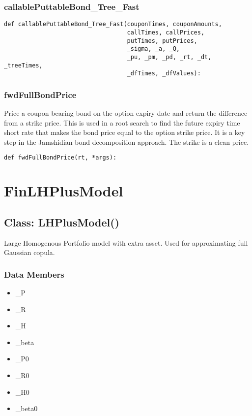 \documentclass[twoside,11pt]{book}
\begin{document}
\subsubsection*{{\bf callablePuttableBond\_Tree\_Fast}}


\begin{lstlisting}
def callablePuttableBond_Tree_Fast(couponTimes, couponAmounts, 
                                   callTimes, callPrices, 
                                   putTimes, putPrices,
                                   _sigma, _a, _Q,
                                   _pu, _pm, _pd, _rt, _dt, _treeTimes,
                                   _dfTimes, _dfValues):
\end{lstlisting}

\subsubsection*{{\bf fwdFullBondPrice}}
Price a coupon bearing bond on the option expiry date and return the difference from a strike price. This is used in a root search to find the future expiry time short rate that makes the bond price equal to the option strike price. It is a key step in the Jamshidian bond decomposition approach. The strike is a clean price.  

\begin{lstlisting}
def fwdFullBondPrice(rt, *args):
\end{lstlisting}

\newpage
\section{FinLHPlusModel}

\subsection*{Class: LHPlusModel()}
Large Homogenous Portfolio model with extra asset. Used for approximating full Gaussian copula.  

\subsubsection*{Data Members}
\begin{itemize}
\item{\_P}
\item{\_R}
\item{\_H}
\item{\_beta}
\item{\_P0}
\item{\_R0}
\item{\_H0}
\item{\_beta0}
\end{itemize}
\end{document}
